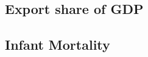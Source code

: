 \documentclass[12pt]{article}
\begin{document}
\subsection{Export share of GDP}

\subsection{Infant Mortality}





\newpage
\singlespacing
\printbibliography

\end{document}

